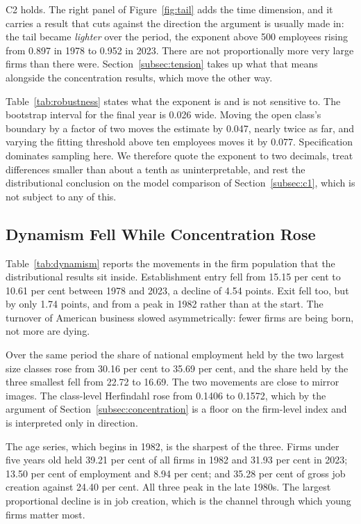 \documentclass[jrfm,article,submit,pdftex,moreauthors]{Definitions/mdpi}
\begin{document}
C2 holds. The right panel of Figure~\ref{fig:tail} adds the time dimension, and it carries a
result that cuts against the direction the argument is usually made in: the tail became
\emph{lighter} over the period, the exponent above 500 employees rising from 0.897 in 1978
to 0.952 in 2023. There are not proportionally more very large firms than there were.
Section~\ref{subsec:tension} takes up what that means alongside the concentration results,
which move the other way.

Table~\ref{tab:robustness} states what the exponent is and is not sensitive to. The bootstrap
interval for the final year is 0.026 wide. Moving the open class's boundary by a factor of
two moves the estimate by 0.047, nearly twice as far, and varying the fitting threshold above
ten employees moves it by 0.077. Specification dominates sampling here. We therefore quote
the exponent to two decimals, treat differences smaller than about a tenth as
uninterpretable, and rest the distributional conclusion on the model comparison of
Section~\ref{subsec:c1}, which is not subject to any of this.



\subsection{Dynamism Fell While Concentration Rose}
\label{subsec:dynamism}

Table~\ref{tab:dynamism} reports the movements in the firm population that the distributional
results sit inside. Establishment entry fell from 15.15 per cent to 10.61 per cent between
1978 and 2023, a decline of 4.54 points. Exit fell too, but by only 1.74 points, and from a
peak in 1982 rather than at the start. The turnover of American business slowed
asymmetrically: fewer firms are being born, not more are dying.



Over the same period the share of national employment held by the two largest size classes
rose from 30.16 per cent to 35.69 per cent, and the share held by the three smallest fell
from 22.72 to 16.69. The two movements are close to mirror images. The class-level Herfindahl
rose from 0.1406 to 0.1572, which by the argument of Section~\ref{subsec:concentration} is a
floor on the firm-level index and is interpreted only in direction.

The age series, which begins in 1982, is the sharpest of the three. Firms under five years
old held 39.21 per cent of all firms in 1982 and 31.93 per cent in 2023; 13.50 per cent of
employment and 8.94 per cent; and 35.28 per cent of gross job creation against 24.40 per
cent. All three peak in the late 1980s. The largest proportional decline is in job creation,
which is the channel through which young firms matter most.
\end{document}
